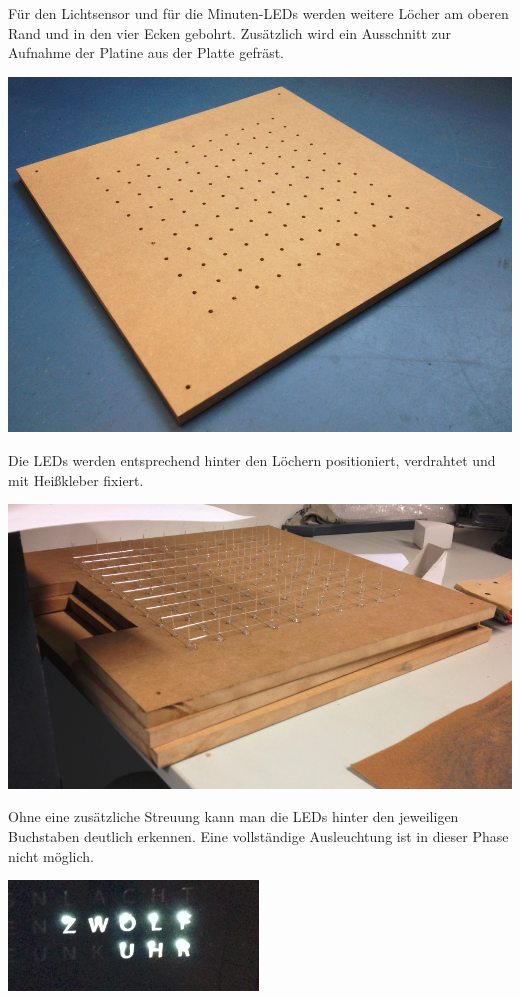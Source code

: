 \begin{multicols}{2}
{}
Für den Lichtsensor und für die Minuten-LEDs werden weitere Löcher am oberen Rand und in den vier Ecken gebohrt. Zusätzlich wird ein Ausschnitt zur Aufnahme der Platine aus der Platte gefräst. 

{
\centering\includegraphics[width=0.85\columnwidth]{Abbildungen/Konstruktion/Platte02}

}
Die LEDs werden entsprechend hinter den Löchern positioniert, verdrahtet und mit Heißkleber fixiert. 

{
\centering\includegraphics[width=0.85\columnwidth]{Abbildungen/Konstruktion/LED01}

}
Ohne eine zusätzliche Streuung kann man die LEDs hinter den jeweiligen Buchstaben deutlich erkennen. Eine vollständige Ausleuchtung ist in dieser Phase nicht möglich. 

{
\centering\includegraphics[width=0.85\columnwidth]{Abbildungen/Konstruktion/LED03}

}
\end{multicols}
